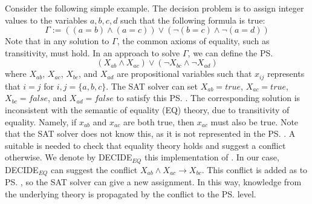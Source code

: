 \begin{example}
Consider the following simple example. The decision problem is to assign integer values to the variables 
$a,b,c,d$ such that the following formula is true: 
\begin{equation}
\Gamma := ((a = b) \wedge (a=c)) \vee (\neg(b = c) \wedge \neg(a=d))
\end{equation}
Note that in any solution to $\Gamma$, the common axioms of equality, such as transitivity, must hold. 
In an \smt approach to solve $\Gamma$, we can define the \ps  
\begin{equation}
 (X_{ab} \wedge X_{ac}) \vee (\neg X_{bc} \wedge \neg X_{ad})   
\end{equation}
where $X_{ab}$, $X_{ac}$, $X_{bc}$, and $X_{ad}$ are propositional variables such that $x_{ij}$ represents that $i=j$ for $i,j=\{a,b,c\}$. 
The SAT solver can set $X_{ab}=true$, $X_{ac}=true$, $X_{bc}=false$, and $X_{ad}=false$ to satisfy this \ps. %
The corresponding solution is inconsistent with the semantic of equality (EQ) theory, due to transitivity of equality. Namely, if $x_{ab}$ and $x_{ac}$ are both true, then $x_{ac}$ must also be true. Note that the SAT solver does not know this, as it is not represented in the \ps. A suitable \decidet is needed to check that equality theory holds and suggest a conflict otherwise. We denote by DECIDE$_{EQ}$ this implementation of \decidet. 
In our case, DECIDE$_{EQ}$ can suggest the conflict $X_{ab} \wedge X_{ac} \rightarrow X_{bc}$. This conflict is added as to \ps, so the SAT solver can give a new assignment. %
In this way, knowledge from the underlying theory is propagated by the conflict to the \ps level.
\end{example}




